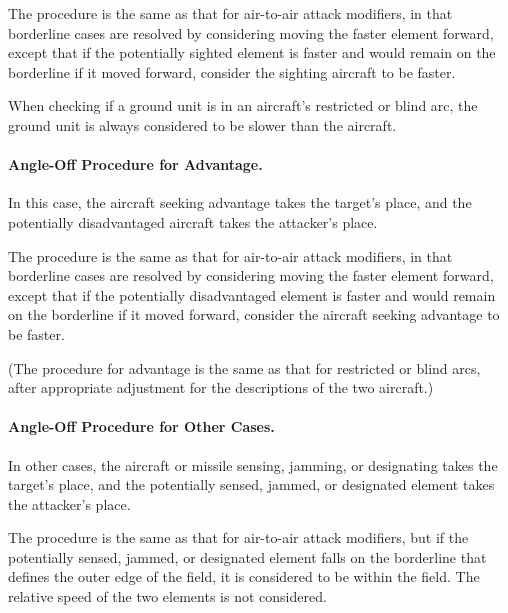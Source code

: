 {The procedure is the same as that for air-to-air attack modifiers, in that borderline cases are resolved by considering moving the faster element forward, except that if the potentially sighted element is faster and would remain on the borderline if it moved forward, consider the sighting aircraft to be faster.

When checking if a ground unit is in an aircraft's restricted or blind arc, the ground unit is always considered to be slower than the aircraft.

\paragraph{Angle-Off Procedure for Advantage.}
In this case, the aircraft seeking advantage takes the target's place, and the potentially disadvantaged aircraft takes the attacker's place.

The procedure is the same as that for air-to-air attack modifiers, in that borderline cases are resolved by considering moving the faster element forward, except that if the potentially disadvantaged element is faster and would remain on the borderline if it moved forward, consider the aircraft seeking advantage to be faster.

(The procedure for advantage is the same as that for restricted or blind arcs, after appropriate adjustment for the descriptions of the two aircraft.)

\paragraph{Angle-Off Procedure for Other Cases.}
In other cases, the aircraft or missile sensing, jamming, or designating takes the target's place, and the potentially sensed, jammed, or designated element takes the attacker's place. 

The procedure is the same as that for air-to-air attack modifiers, but if the potentially sensed, jammed, or designated element falls on the borderline that defines the outer edge of the field, it is considered to be within the field. The relative speed of the two elements is not considered.

}

